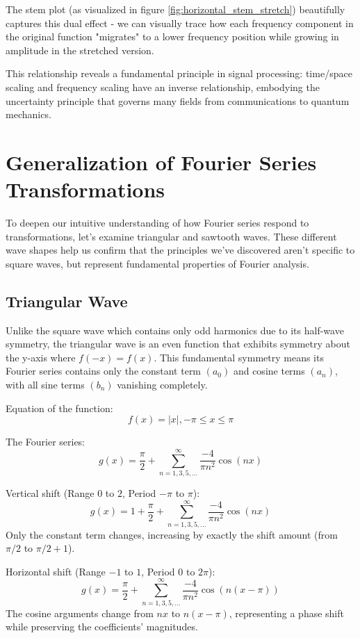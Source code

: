 \documentclass{article}
\begin{document}
The stem plot (as visualized in figure \ref{fig:horizontal_stem_stretch}) beautifully captures this dual effect - we can visually trace how each frequency component in the original function "migrates" to a lower frequency position while growing in amplitude in the stretched version.

This relationship reveals a fundamental principle in signal processing: time/space scaling and frequency scaling have an inverse relationship, embodying the uncertainty principle that governs many fields from communications to quantum mechanics.

\section{Generalization of Fourier Series Transformations}

To deepen our intuitive understanding of how Fourier series respond to transformations, let's examine triangular and sawtooth waves. These different wave shapes help us confirm that the principles we've discovered aren't specific to square waves, but represent fundamental properties of Fourier analysis.

\subsection{Triangular Wave}

Unlike the square wave which contains only odd harmonics due to its half-wave symmetry, the triangular wave  is an even function that exhibits symmetry about the y-axis where $f(-x) = f(x)$. This fundamental symmetry means its Fourier series contains only the constant term $(a_0)$ and cosine terms $(a_n)$, with all sine terms $(b_n)$ vanishing completely. 

Equation of the function:
\begin{equation}
f(x) = |x|,  -\pi \leq x \leq \pi
\end{equation}

The Fourier series:
$$g(x) = \frac{\pi}{2} +\sum_{n=1,3,5,...}^{\infty}\frac{-4}{\pi n^2}\cos(nx)$$

Vertical shift (Range $0$ to $2$, Period $-\pi$ to $\pi$):
$$g(x) = 1 + \frac{\pi}{2} +\sum_{n=1,3,5,...}^{\infty}\frac{-4}{\pi n^2}\cos(nx)$$
Only the constant term changes, increasing by exactly the shift amount (from $\pi/2$ to $\pi/2 + 1$).

Horizontal shift (Range $-1$ to $1$, Period $0$ to $2\pi$):
$$g(x) = \frac{\pi}{2} + \sum_{n=1,3,5,...}^{\infty}\frac{-4}{\pi n^2}\cos(n(x-\pi))$$
The cosine arguments change from $nx$ to $n(x-π)$, representing a phase shift while preserving the coefficients' magnitudes.
\end{document}
